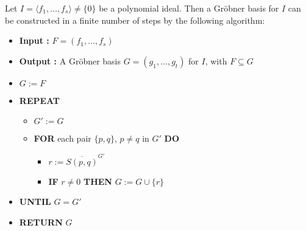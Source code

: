 \begin{theorem}
  \label{thm:Buchbergers_Algorithm}
  \leanok 
  Let $I = \langle f_1, \ldots, f_s \rangle \ne \{0\}$ be a polynomial ideal. Then a Gr{\"o}bner basis for $I$ can be constructed in a finite number of steps by the following algorithm:
  \normalfont %
  \begin{itemize}
      \item[] \textbf{Input :} $F = (f_1, \ldots, f_s)$
      \item[] \textbf{Output :} A Gr{\"o}bner basis $G = (g_1, \ldots, g_t)$ for $I$, with $F \subseteq G$
      \vspace{1ex}
      \item[] $G := F$
      \item[] \textbf{REPEAT}
      \begin{itemize}
          \item[] $G' := G$
          \item[] \textbf{FOR} each pair $\{p, q\}$, $p \ne q$ in $G'$ \textbf{DO}
          \begin{itemize}
              \item[] $r := \overline{S(p, q)}^{G'}$
              \item[] \textbf{IF} $r \ne 0$ \textbf{THEN} $G := G \cup \{r\}$
          \end{itemize}
      \end{itemize}
      \item[] \textbf{UNTIL} $G = G'$
      \item[] \textbf{RETURN} $G$
  \end{itemize}
\end{theorem}
